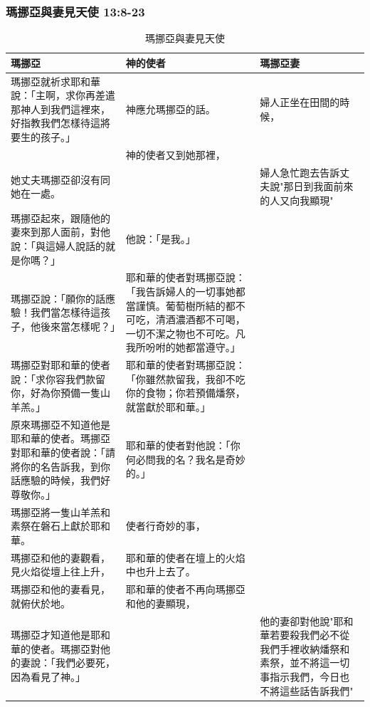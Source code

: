 \subsubsection{瑪挪亞與妻見天使 13:8-23}
\begin{table}[H]
\centering
\begin{tabular}{p{}|p{6.6cm}|p{3.4cm}}\hline
瑪挪亞&神的使者&瑪挪亞妻\\\hline
瑪挪亞就祈求耶和華說：「主啊，求你再差遣那神人到我們這裡來，好指教我們怎樣待這將要生的孩子。」&神應允瑪挪亞的話。&婦人正坐在田間的時候，\\\hline
&神的使者又到她那裡，& \\\hline
她丈夫瑪挪亞卻沒有同她在一處。&&婦人急忙跑去告訴丈夫說"那日到我面前來的人又向我顯現"\\\hline
瑪挪亞起來，跟隨他的妻來到那人面前，對他說：「與這婦人說話的就是你嗎？」&
他說：「是我。」&\\\hline
瑪挪亞說：「願你的話應驗！我們當怎樣待這孩子，他後來當怎樣呢？」&
耶和華的使者對瑪挪亞說：「我告訴婦人的一切事她都當謹慎。葡萄樹所結的都不可吃，清酒濃酒都不可喝，一切不潔之物也不可吃。凡我所吩咐的她都當遵守。」&\\\hline
瑪挪亞對耶和華的使者說：「求你容我們款留你，好為你預備一隻山羊羔。」&耶和華的使者對瑪挪亞說：「你雖然款留我，我卻不吃你的食物；你若預備燔祭，就當獻於耶和華。」&\\\hline
原來瑪挪亞不知道他是耶和華的使者。瑪挪亞對耶和華的使者說：「請將你的名告訴我，到你話應驗的時候，我們好尊敬你。」&耶和華的使者對他說：「你何必問我的名？我名是奇妙的。」&\\\hline
瑪挪亞將一隻山羊羔和素祭在磐石上獻於耶和華。&使者行奇妙的事，&\\\hline
瑪挪亞和他的妻觀看，見火焰從壇上往上升，&耶和華的使者在壇上的火焰中也升上去了。&\\\hline
瑪挪亞和他的妻看見，就俯伏於地。
&耶和華的使者不再向瑪挪亞和他的妻顯現，&\\\hline
瑪挪亞才知道他是耶和華的使者。瑪挪亞對他的妻說：「我們必要死，因為看見了神。」&&他的妻卻對他說"耶和華若要殺我們必不從我們手裡收納燔祭和素祭，並不將這一切事指示我們，今日也不將這些話告訴我們"\\\hline
 \end{tabular}
\caption{瑪挪亞與妻見天使}
\end{table}  



